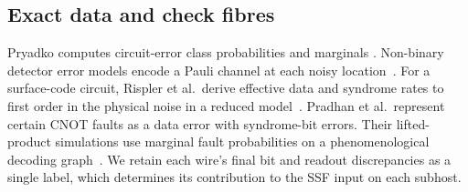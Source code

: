 \documentclass[10pt,twocolumn]{article}
\theoremstyle{definition}
\begin{document}
\subsection{Exact data and check fibres}\label{app:fibre-transfer}
Pryadko computes circuit-error class probabilities and marginals
\cite{Pry20}. Non-binary detector error models encode a Pauli channel
at each noisy location~\cite{TLG26}. For a surface-code circuit, Rispler
et al.\ derive effective data and syndrome rates to first order in the
physical noise in a reduced model~\cite[Eqs.~(32)--(34)]{RVMK26}.
Pradhan et al.\ represent certain CNOT faults as a data error with
syndrome-bit errors. Their lifted-product simulations use marginal
fault probabilities on a phenomenological decoding graph~\cite[Secs.~VI and~VII.B]{PRDV26}.
We retain each wire's final bit and readout discrepancies as a single
label, which determines its contribution to the SSF input on each subhost.
\end{document}
